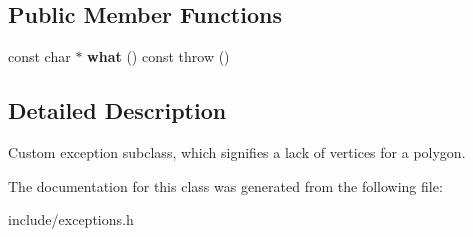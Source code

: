\subsection*{Public Member Functions}
\begin{DoxyCompactItemize}
\item 
\mbox{\label{classDrawingIncomplete_afa21aa1cde73e32fee133dbd1b131c3e}} 
const char $\ast$ {\bfseries what} () const  throw ()
\end{DoxyCompactItemize}


\subsection{Detailed Description}
Custom exception subclass, which signifies a lack of vertices for a polygon. 

The documentation for this class was generated from the following file\+:\begin{DoxyCompactItemize}
\item 
include/exceptions.\+h\end{DoxyCompactItemize}

